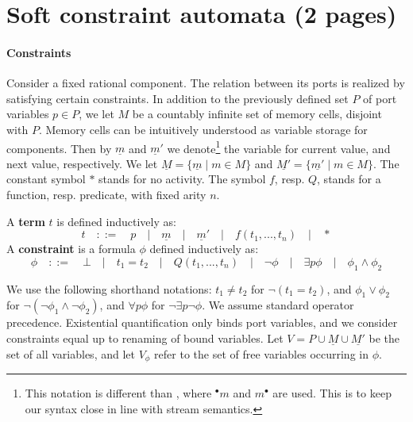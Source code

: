 \section{Soft constraint automata (2 pages)}

\paragraph{Constraints}
Consider a fixed rational component.
The relation between its ports is realized by satisfying certain constraints.
In addition to the previously defined set $P$ of port variables $p\in P$,
we let $M$ be a countably infinite set of memory cells, disjoint with $P$.
Memory cells can be intuitively understood as variable storage for components.
Then by $\underline{m}$ and $\underline{m}'$ we
denote\footnote{
	This notation is different than \cite{jongmans}, where $^\bullet m$ and $m^\bullet$ are used.
	This is to keep our syntax close in line with stream semantics.}
the variable for current value, and next value, respectively.
We let $\underline{M}=\{\underline{m}\mid m\in M\}$ and $\underline{M'}=\{\underline{m'}\mid m\in M\}$.
The constant symbol $*$ stands for no activity.
The symbol $f$, resp. $Q$, stands for a function, resp. predicate, with fixed arity $n$.

\begin{definition} A \textbf{term} $t$ is defined inductively as:
	$$ t \quad ::= \quad p \quad|
		\quad \underline{m} \quad|
		\quad \underline{m}' \quad|
		\quad f(t_1, ..., t_n) \quad|
		\quad * $$
	A \textbf{constraint} is a formula $\phi$ defined inductively as:
	$$ \phi \quad ::= \quad \bot \quad |
		\quad t_1 = t_2 \quad|
		\quad Q(t_1, ... , t_n) \quad|
		\quad \neg \phi \quad|
		\quad \exists p \phi \quad|
		\quad \phi_1 \land \phi_2 $$
\end{definition}

We use the following shorthand notations: $t_1 \not= t_2$ for $\neg (t_1=t_2)$,
and $\phi_1 \lor \phi_2$ for $\neg (\neg \phi_1 \land \neg\phi_2)$,
and $\forall p \phi$ for $\neg \exists p \neg\phi$.
We assume standard operator precedence.
Existential quantification only binds port variables,
and we consider constraints equal up to renaming of bound variables.
Let $V=P\cup\underline{M}\cup\underline{M'}$ be the set of all variables,
and let $V_{\phi}$ refer to the set of free variables occurring in $\phi$.

